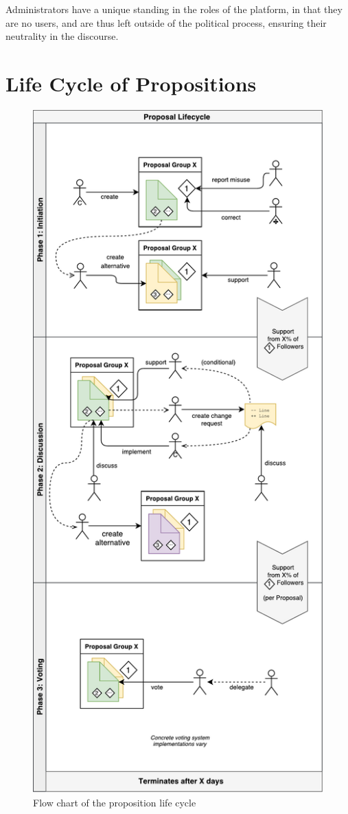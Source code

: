 Administrators have a unique standing in the roles of the platform, in that they are no users, and are thus left outside of the political process, ensuring their neutrality in the discourse.

\section{Life Cycle of Propositions}
\label{sec:Model_Propositions}

\begin{figure}[t]
\centering
\includegraphics[height=0.6\paperheight]{../img/lifecycle_flow_v0.pdf}
\caption{Flow chart of the proposition life cycle}
\label{fig:proplife}
\end{figure}

